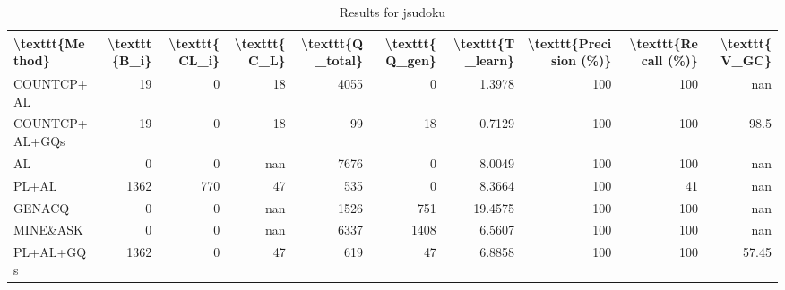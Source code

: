 \begin{table}[ht]
\caption{Results for jsudoku}
\begin{tabular}{lrrrrrrrrr}
\hline
 \textbackslash{}texttt\{Method\}   &   \textbackslash{}texttt\{B\_i\} &   \textbackslash{}texttt\{CL\_i\} &   \textbackslash{}texttt\{C\_L\} &   \textbackslash{}texttt\{Q\_total\} &   \textbackslash{}texttt\{Q\_gen\} &   \textbackslash{}texttt\{T\_learn\} &   \textbackslash{}texttt\{Precision (\%)\} &   \textbackslash{}texttt\{Recall (\%)\} &   \textbackslash{}texttt\{V\_GC\} \\
\hline
 COUNTCP+AL        &             19 &               0 &             18 &               4055 &                0 &             1.3978 &                      100 &                   100 &          nan    \\
 COUNTCP+AL+GQs    &             19 &               0 &             18 &                 99 &               18 &             0.7129 &                      100 &                   100 &           98.5  \\
 AL                &              0 &               0 &            nan &               7676 &                0 &             8.0049 &                      100 &                   100 &          nan    \\
 PL+AL             &           1362 &             770 &             47 &                535 &                0 &             8.3664 &                      100 &                    41 &          nan    \\
 GENACQ            &              0 &               0 &            nan &               1526 &              751 &            19.4575 &                      100 &                   100 &          nan    \\
 MINE\&ASK          &              0 &               0 &            nan &               6337 &             1408 &             6.5607 &                      100 &                   100 &          nan    \\
 PL+AL+GQs         &           1362 &               0 &             47 &                619 &               47 &             6.8858 &                      100 &                   100 &           57.45 \\
\hline
\end{tabular}
\end{table}